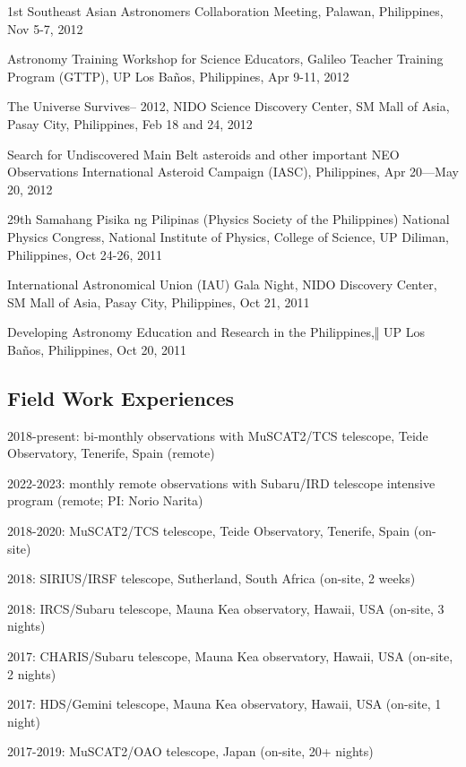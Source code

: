 \documentclass[11pt,letterpaper]{article}
\begin{document}
\begin{list}{}{\cvlist}
    \item 1st Southeast Asian Astronomers Collaboration Meeting, Palawan, Philippines, Nov 5-7, 2012
    \item Astronomy Training Workshop for Science Educators, Galileo Teacher Training Program (GTTP), UP Los Baños, Philippines, Apr 9-11, 2012
    \item The Universe Survives– 2012, NIDO Science Discovery Center, SM Mall of Asia, Pasay City, Philippines, Feb 18 and 24, 2012
    \item Search for Undiscovered Main Belt asteroids and other important NEO Observations International Asteroid Campaign (IASC), Philippines, Apr 20—May 20, 2012
    \item 29th Samahang Pisika ng Pilipinas (Physics Society of the Philippines) National Physics Congress, National Institute of Physics, College of Science, UP Diliman, Philippines, Oct 24-26, 2011
    \item International Astronomical Union (IAU) Gala Night, NIDO Discovery Center, SM Mall of Asia, Pasay City, Philippines, Oct 21, 2011
    \item Developing Astronomy Education and Research in the Philippines,‖ UP Los Baños, Philippines, Oct 20, 2011
\end{list}

\subsection{Field Work Experiences}
\begin{list}{}{\cvlist}
    \item 2018-present: bi-monthly observations with MuSCAT2/TCS telescope, Teide Observatory, Tenerife, Spain (remote)
    \item 2022-2023: monthly remote observations with Subaru/IRD telescope intensive program (remote; PI: Norio Narita)
    \item 2018-2020: MuSCAT2/TCS telescope, Teide Observatory, Tenerife, Spain (on-site) 
    \item 2018: SIRIUS/IRSF telescope, Sutherland, South Africa (on-site, 2 weeks)
    \item 2018: IRCS/Subaru telescope, Mauna Kea observatory, Hawaii, USA (on-site, 3 nights)
    \item 2017: CHARIS/Subaru telescope, Mauna Kea observatory, Hawaii, USA (on-site, 2 nights)
    \item 2017: HDS/Gemini telescope, Mauna Kea observatory, Hawaii, USA (on-site, 1 night)
    \item 2017-2019: MuSCAT2/OAO telescope, Japan (on-site, 20+ nights)
\end{list}
\end{document}
